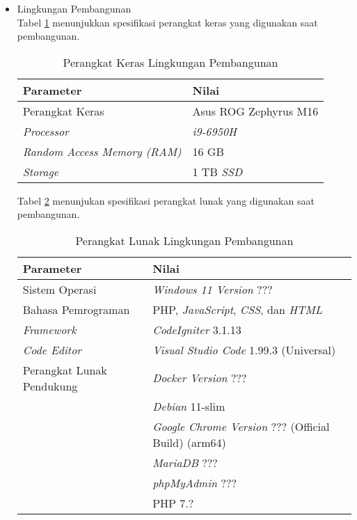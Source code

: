 \begin{itemize}
    \item Lingkungan Pembangunan \\
          Tabel \ref{tab:5:1:keraspembangunan} menunjukkan spesifikasi perangkat keras yang digunakan saat pembangunan.
          \begin{table}[H]
              \caption{Perangkat Keras Lingkungan Pembangunan}
              \label{tab:5:1:keraspembangunan}
              \centering
              \begin{tabular}{|l|l|}
                  \hline
                  \textbf{Parameter}                  & \textbf{Nilai}        \\ \hline
                  Perangkat Keras                     & Asus ROG Zephyrus M16 \\ \hline
                  \textit{Processor}                  & \textit{i9-6950H}     \\ \hline
                  \textit{Random Access Memory (RAM)} & 16 GB                 \\ \hline
                  \textit{Storage}                    & 1 TB \textit{SSD}     \\ \hline
              \end{tabular}
          \end{table}

          Tabel \ref{tab:5:1:lunakpembangunan} menunjukan spesifikasi perangkat lunak yang digunakan saat pembangunan.

          \begin{table}[H]
              \caption{Perangkat Lunak Lingkungan Pembangunan}
              \label{tab:5:1:lunakpembangunan}
              \centering
              \begin{tabular}{|l|l|}
                  \hline
                  \textbf{Parameter}        & \textbf{Nilai}                                            \\ \hline
                  Sistem Operasi            & \textit{Windows 11 Version} ???                           \\ \hline
                  Bahasa Pemrograman        & PHP, \textit{JavaScript}, \textit{CSS}, dan \textit{HTML} \\ \hline
                  \textit{Framework}        & \textit{CodeIgniter} 3.1.13                               \\ \hline
                  \textit{Code Editor}      & \textit{Visual Studio Code} 1.99.3 (Universal)            \\ \hline
                  Perangkat Lunak Pendukung & \textit{Docker Version} ???                               \\ & \textit{Debian} 11-slim \\ & \textit{Google Chrome Version} ??? (Official Build) (arm64)\\ & \textit{MariaDB} ??? \\ & \textit{phpMyAdmin} ??? \\ & PHP 7.?\\ \hline
              \end{tabular}
          \end{table}


\end{itemize}
